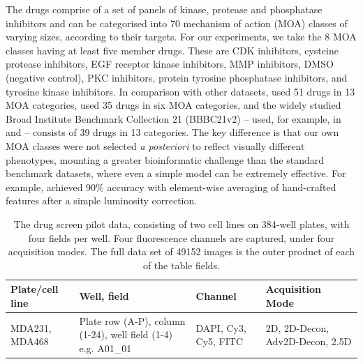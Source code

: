 The drugs comprise of a set of panels of kinase, protease and phosphatase inhibitors and can be categorised into 70 mechanism of action (MOA) classes of varying sizes, according to their targets. For our experiments, we take the 8 MOA classes having at least five member drugs. These are CDK inhibitors, cysteine protease inhibitors, EGF receptor kinase inhibitors, MMP inhibitors, DMSO (negative control), PKC inhibitors, protein tyrosine phosphatase inhibitors, and tyrosine kinase inhibitors. In comparison with other datasets, \cite{adams2006compound} used 51 drugs in 13 MOA categories, \cite{slack2008characterizing} used 35 drugs in six MOA categories, and the widely studied Broad Institute Benchmark Collection 21 (BBBC21v2) \cite{ljosa2012annotated} -- used, for example, in \cite{kandaswamy2016high} and \cite{godinez2017multi} -- consists of 39 drugs in 13 categories. The key difference is that our own MOA classes were not selected \emph{a posteriori} to reflect visually different phenotypes, mounting a greater bioinformatic challenge than the standard benchmark datasets, where even a simple model can be extremely effective. For example, \cite{singh2014pipeline} achieved $90\%$ accuracy with element-wise averaging of hand-crafted features after a simple luminosity correction.

\begin{table}
\begin{center}
\begin{tabular}{|p{2.5cm}|p{3cm}|p{2.5cm}|p{3cm}|}
\hline
Plate/cell line & Well, field & Channel & Acquisition Mode \\
\hline
MDA231, MDA468 & Plate row (A-P), column (1-24), well field (1-4) e.g. A01\_01 & DAPI, Cy3, Cy5, FITC & 2D, 2D-Decon, Adv2D-Decon, 2.5D \\
\hline
\end{tabular}
\caption{The drug screen pilot data, consisting of two cell lines on 384-well plates, with four fields per well. Four fluorescence channels are captured, under four acquisition modes. The full data set of 49152 images is the outer product of each of the table fields.}
\label{table:drugscreen}
\end{center}
\end{table}

